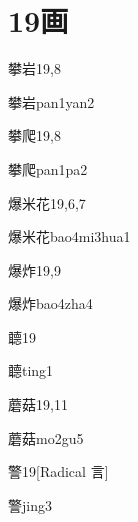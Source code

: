 
\section*{19画}

\begin{entry}{攀岩}{19,8}
  \begin{phonetics}{攀岩}{pan1yan2}
  \end{phonetics}
\end{entry}

\begin{entry}{攀爬}{19,8}
  \begin{phonetics}{攀爬}{pan1pa2}
  \end{phonetics}
\end{entry}

\begin{entry}{爆米花}{19,6,7}
  \begin{phonetics}{爆米花}{bao4mi3hua1}
  \end{phonetics}
\end{entry}

\begin{entry}{爆炸}{19,9}
  \begin{phonetics}{爆炸}{bao4zha4}
  \end{phonetics}
\end{entry}

\begin{entry}{聼}{19}
  \begin{phonetics}{聼}{ting1}
  \end{phonetics}
\end{entry}

\begin{entry}{蘑菇}{19,11}
  \begin{phonetics}{蘑菇}{mo2gu5}
  \end{phonetics}
\end{entry}

\begin{entry}{警}{19}[Radical 言]
  \begin{phonetics}{警}{jing3}
  \end{phonetics}
\end{entry}

